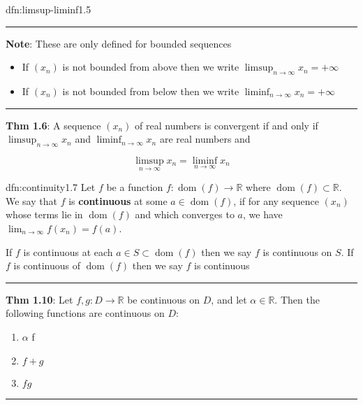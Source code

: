 \documentclass[landscape, 8pt]{extarticle}
\DeclareMathOperator{\dom}{dom}
\begin{document}
\begin{multicols}{3}
\begin{dfn}{dfn:limsup-liminf}{1.5}
	\noindent\rule{\textwidth}{0.2pt}
	\textbf{Note}: These are only defined for bounded sequences

	\vspace{-5pt}
	\begin{itemize}
		\setlength\itemsep{0em}
		\item If $(x_{n})$ is not bounded from above then we write $\limsup_{n \to \infty} x_{n} = +\infty$

		\item If $(x_{n})$ is not bounded from below then we write $\liminf_{n \to \infty} x_{n} = +\infty$
	\end{itemize}

	\vspace{-5pt}
	\noindent\rule{\textwidth}{0.2pt}
	\textbf{Thm 1.6}: A sequence $(x_{n})$ of real numbers is convergent if and only if $\limsup_{n \to \infty}x_{n}$ and $\liminf_{n \to \infty}x_{n}$ are real numbers and

	\[\limsup_{n \to \infty} x_{n} = \liminf_{n \to \infty} x_{n}\]
\end{dfn}

\begin{dfn}[Continuity]{dfn:continuity}{1.7}
	Let $f$ be a function $f : \dom(f) \to \mathbb{R}$ where $\dom(f)\subset \mathbb{R}$. We say that $f$ is \textbf{continuous} at some $a\in \dom(f)$, if for any sequence $(x_{n})$ whose terms lie in $\dom(f)$ and which converges to $a$, we have $\lim_{n\to \infty} f(x_{n}) = f(a)$.

	If $f$ is continuous at each $a\in S \subset \dom(f)$ then we say $f$ is continuous on $S$. If $f$ is continuous of $\dom(f)$ then we say $f$ is continuous

	\noindent\rule{\textwidth}{0.2pt}
	\textbf{Thm 1.10}: Let $f, g : D \to \mathbb{R}$ be continuous on $D$, and let $\alpha\in \mathbb{R}$. Then the following functions are continuous on $D:$

	\vspace{-10pt}
	\begin{multicols}{3}
		\begin{enumerate}
			\item $\alpha$ f
			\item $f + g$
			\item $fg$
		\end{enumerate}
	\end{multicols}

	\vspace{-10pt}
	\noindent\rule{\textwidth}{0.2pt}


\end{dfn}
\end{multicols}
\end{document}
